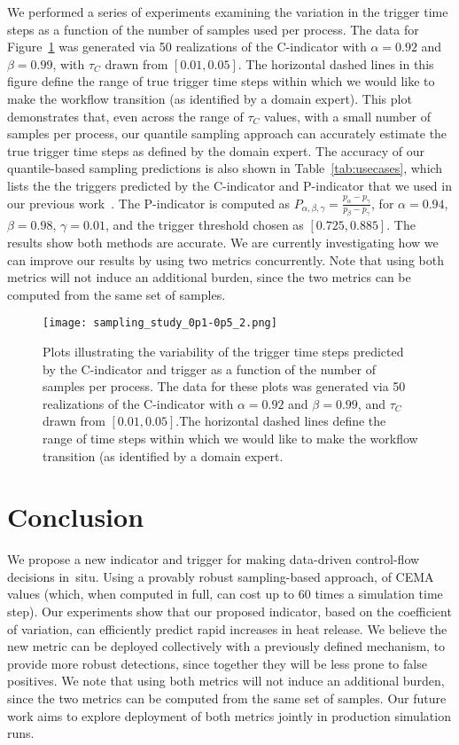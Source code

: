 \documentclass{sig-alternate}
\newcommand{\cmetric}{C}
\newcommand{\pmetric}{P}
\newcommand{\pt}{{p}}
\newcommand{\thresh}{\tau}
\begin{document}
We performed a series of experiments examining the variation in the trigger time steps 
as a function of the number of samples used per process.  The data for
Figure~\ref{fig:sampling} was generated via 50 realizations of  the
\cmetric-indicator with $\alpha=0.92$ and $\beta=0.99$,
with $\thresh_{\cmetric}$ drawn from $[0.01, 0.05]$. The
horizontal dashed lines in this figure define the range of true trigger time steps within
which we would like to make the workflow transition (as identified by a domain expert).
This plot demonstrates that, even across the range of $\thresh_{\cmetric}$
values,  with a small number of samples per process, our quantile sampling
approach can accurately estimate the  true trigger time steps as defined by the
domain expert. 
The accuracy of our quantile-based sampling predictions is also shown in Table~\ref{tab:usecases}, which lists the the triggers predicted by the \cmetric-indicator and
\pmetric-indicator that we used in our previous work~\cite{cema-insitu}. The \pmetric-indicator is computed as $\pmetric_{\alpha,\beta,\gamma} = \frac{\pt_\alpha - \pt_\gamma}{\pt_\beta - \pt_\gamma}$,
for $\alpha=0.94$, $\beta=0.98$, $\gamma= 0.01$,  and the trigger threshold chosen as $[0.725, 0.885]$. The results show both methods are accurate. We are currently investigating  how  we can improve our results by using two metrics concurrently. Note that  using both metrics will not induce an additional burden, since the two metrics  can be computed from the same set of samples.  

\begin{figure}[t]
\centering
\texttt{[image: sampling\_study\_0p1-0p5\_2.png]}
\caption{\label{fig:sampling} Plots illustrating the variability of the trigger
time steps 
predicted by the \cmetric-indicator and trigger as a function of the number of
samples per process.  The data for these plots was generated via 50
realizations of the \cmetric-indicator with $\alpha=0.92$ and $\beta=0.99$, and
$\thresh_{\cmetric}$ drawn from $[0.01, 0.05]$.The horizontal dashed lines
define the range of time steps within which we would like to make the workflow
transition (as identified by a domain expert.}
\end{figure}


\section{Conclusion}
\label{sec:conc} 
We propose a new indicator and trigger 
for making data-driven control-flow decisions in~situ. Using a provably robust
sampling-based approach, 
of CEMA values (which, when computed in full, can cost up to 60 times a
simulation time step).  Our experiments show that our proposed indicator, based
on the coefficient of variation, can  efficiently predict rapid increases in heat
release.  We believe the new metric 
can be deployed collectively with a previously defined mechanism, 
to  provide more robust detections, since together they will be  less prone to false positives. We  note that  using both metrics 
will not induce an additional burden, since the two metrics  can be computed
from the same set of samples.  Our future work aims to explore deployment of
both metrics jointly in production simulation runs. 
\end{document}
